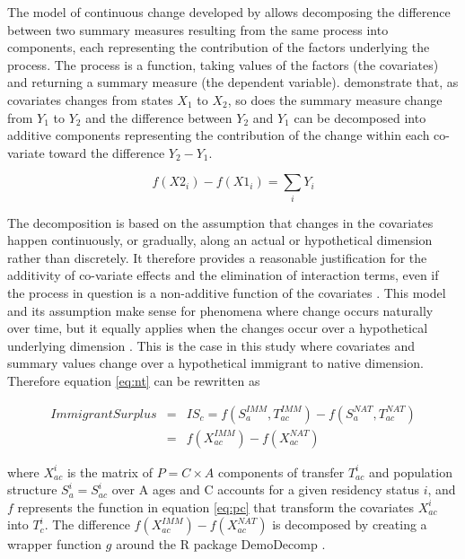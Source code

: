 The model of continuous change developed by \citet{Horiuchi:2008cn} allows decomposing the difference between two summary measures resulting from the same process into components, each representing the contribution of the factors underlying the process.
The process is a function, taking values of the factors (the covariates) and returning a summary measure (the dependent variable). \citet{Horiuchi:2008cn} demonstrate that, as covariates changes from states \( X_1 \) to \( X_2 \),  so does the summary measure change from \( Y_1 \) to \( Y_2 \)  and the difference between \( Y_2 \) and \( Y_1 \) can be decomposed into additive components representing the contribution of the change within each co-variate toward the difference \( Y_2 - Y_1\).

\begin{equation}\label{eq:ho}
  f(X2_{i}) - f(X1_{i}) = \displaystyle\sum_{i}Y_{i}
\end{equation}

The decomposition is based on the assumption that changes in the covariates happen continuously, or gradually, along an actual or hypothetical dimension rather than discretely.
It therefore provides a reasonable justification for the additivity of co-variate effects and the elimination of interaction terms, even if the process in question is a non-additive function of the covariates \citep[p.~786]{Horiuchi:2008cn}.
This model and its assumption make sense for phenomena where change occurs naturally over time, but it equally applies when the changes occur over a hypothetical underlying dimension \citep[p.~790]{Horiuchi:2008cn}.
This is the case in this study where covariates and summary values change over a hypothetical immigrant to native dimension.
Therefore equation \eqref{eq:nt} can be rewritten as

\begin{eqnarray}
  Immigrant Surplus &=&IS_{c}=f(S^{IMM}_a, T^{IMM}_{ac})-f(S^{NAT}_a, T^{NAT}_{ac}) \nonumber \\
&=& f(X^{IMM}_{ac})-f(X^{NAT}_{ac}) \label{eq:dc}
\end{eqnarray}

\vspace{0.7em}\par
where \( X^{i}_{ac}\) is the matrix of \( P=C \times A  \) components of transfer \( T^{i}_{ac} \) and population structure \( S^{i}_{a}=S^{i}_{ac} \) over A ages and C accounts for a given residency status \( i \), and \( f \) represents the function in equation \eqref{eq:pc} that transform the covariates \( X^{i}_{ac}\) into \(T^{i}_c\).
The difference \( f(X^{IMM}_{ac}) - f(X^{NAT}_{ac}) \) is decomposed by creating a wrapper function \(g\) around the R package DemoDecomp \citep{DemoDecomp:2018,Rstat:2018}.

